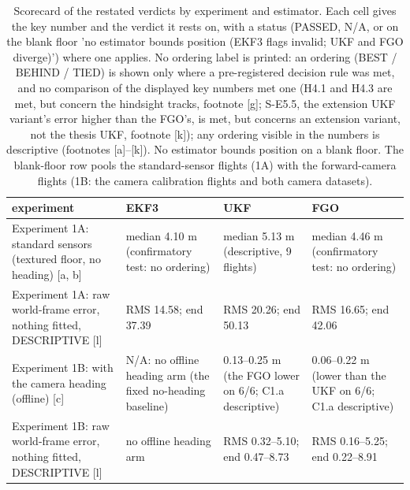 \begin{table}[htbp]
\centering
\footnotesize
\caption{Scorecard of the restated verdicts by experiment and estimator. Each cell gives the key number and the verdict it rests on, with a status (PASSED, N/A, or on the blank floor 'no estimator bounds position (EKF3 flags invalid; UKF and FGO diverge)') where one applies. No ordering label is printed: an ordering (BEST / BEHIND / TIED) is shown only where a pre-registered decision rule was met, and no comparison of the displayed key numbers met one (H4.1 and H4.3 are met, but concern the hindsight tracks, footnote [g]; S-E5.5, the extension UKF variant's error higher than the FGO's, is met, but concerns an extension variant, not the thesis UKF, footnote [k]); any ordering visible in the numbers is descriptive (footnotes [a]--[k]). No estimator bounds position on a blank floor. The blank-floor row pools the standard-sensor flights (1A) with the forward-camera flights (1B: the camera calibration flights and both camera datasets).}
\label{tab:T1}
\begin{tabular}{p{}p{}p{}p{}}
\toprule
\textbf{experiment} & \textbf{EKF3} & \textbf{UKF} & \textbf{FGO} \\
\midrule
Experiment 1A: standard sensors (textured floor, no heading) [a, b] & median 4.10 m (confirmatory test: no ordering) & median 5.13 m (descriptive, 9 flights) & median 4.46 m (confirmatory test: no ordering) \\
Experiment 1A: raw world-frame error, nothing fitted, DESCRIPTIVE [l] & RMS 14.58; end 37.39 & RMS 20.26; end 50.13 & RMS 16.65; end 42.06 \\
Experiment 1B: with the camera heading (offline) [c] & N/A: no offline heading arm (the fixed no-heading baseline) & 0.13--0.25 m (the FGO lower on 6/6; C1.a descriptive) & 0.06--0.22 m (lower than the UKF on 6/6; C1.a descriptive) \\
Experiment 1B: raw world-frame error, nothing fitted, DESCRIPTIVE [l] & no offline heading arm & RMS 0.32--5.10; end 0.47--8.73 & RMS 0.16--5.25; end 0.22--8.91 \\

\end{tabular}
\end{table}
